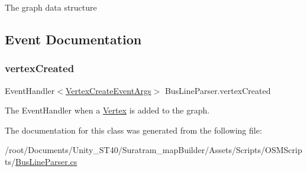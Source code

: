 The graph data structure



\subsection{Event Documentation}
\mbox{\label{classBusLineParser_af57e1b61eb76dec97cb8f5c08b1cf2f3}} 
\subsubsection{\texorpdfstring{vertex\+Created}{vertexCreated}}
{\footnotesize\ttfamily Event\+Handler$<$\hyperlink{classVertexCreateEventArgs}{Vertex\+Create\+Event\+Args}$>$ Bus\+Line\+Parser.\+vertex\+Created}



The Event\+Handler when a \hyperlink{structVertex}{Vertex} is added to the graph.



The documentation for this class was generated from the following file\+:\begin{DoxyCompactItemize}
\item 
/root/\+Documents/\+Unity\+\_\+\+S\+T40/\+Suratram\+\_\+map\+Builder/\+Assets/\+Scripts/\+O\+S\+M\+Scripts/\hyperlink{BusLineParser_8cs}{Bus\+Line\+Parser.\+cs}\end{DoxyCompactItemize}
